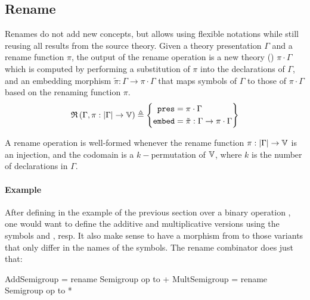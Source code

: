 \subsection{Rename}
\label{subsec:rename}
Renames do not add new concepts, but allows using flexible notations while still reusing all results from the source theory. 
Given a theory presentation $\Gamma$ and a rename function $\pi$, the output of the rename operation is a new theory () $\pi \cdot \Gamma$ which is computed by performing a substitution of $\pi$ into the declarations of $\Gamma$, and an embedding morphism $\tilde{\pi} : \Gamma \to \pi\cdot\Gamma$ that maps symbols of $\Gamma$ to those of $\pi\cdot\Gamma$ based on the renaming function $\pi$. 
\[ \mathfrak{R}\left(\Gamma, \pi : \left| \Gamma \right| \rightarrow \mathbb{V}\right) \triangleq \left\{\begin{aligned} \mathtt{pres} & = \pi \cdot \Gamma \\ \mathtt{embed} & = \tilde{\pi}:\Gamma \rightarrow \pi\cdot\Gamma \end{aligned}\right\} \]

A rename operation is well-formed whenever the rename function $\pi : |\Gamma| \to \mathbb{V}$ is an injection, and the codomain is a $k-$permutation of $\mathbb{V}$, where $k$ is the number of declarations in $\Gamma$. 

\paragraph{Example}
After defining  in the example of the previous section over a binary operation , one would want to define the additive and multiplicative versions using the symbols \lstmath{+} and \lstmath{*}, resp. It also make sense to have a morphism from  to those variants that only differ in the names of the symbols. The rename combinator does just that: 
\begin{togcode}
AddSemigroup  = rename Semigroup {op to +} 
MultSemigroup = rename Semigroup {op to *} 
\end{togcode}  

